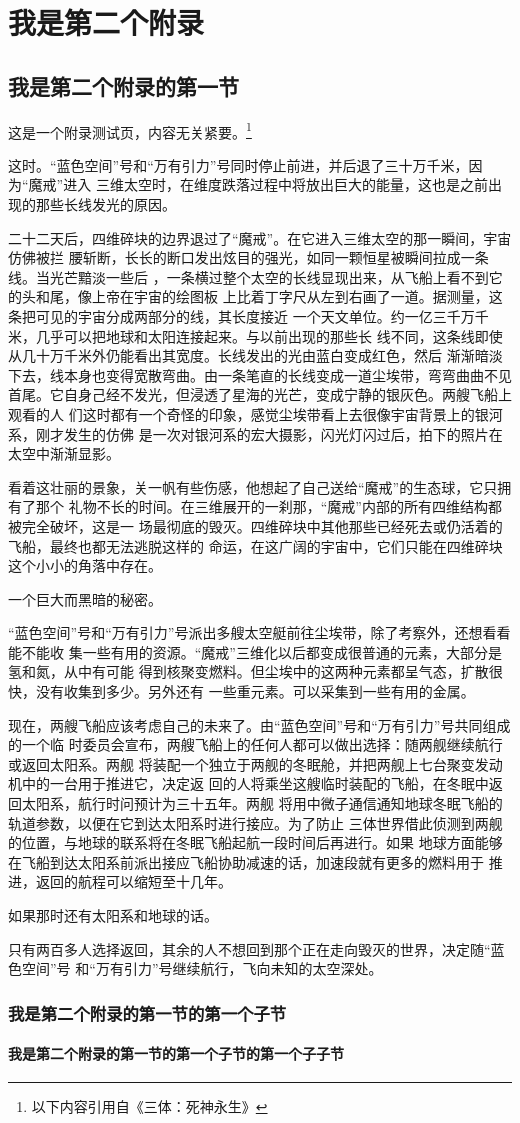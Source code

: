 \chapter{我是第二个附录}
\section{我是第二个附录的第一节}
这是一个附录测试页，内容无关紧要。\footnote{以下内容引用自《三体：死神永生》}

这时。“蓝色空间”号和“万有引力”号同时停止前进，并后退了三十万千米，因为“魔戒”进入%
三维太空时，在维度跌落过程中将放出巨大的能量，这也是之前出现的那些长线发光的原因。%

二十二天后，四维碎块的边界退过了“魔戒”。在它进入三维太空的那一瞬间，宇宙仿佛被拦%
腰斩断，长长的断口发出炫目的强光，如同一颗恒星被瞬间拉成一条线。当光芒黯淡一些后%
，一条横过整个太空的长线显现出来，从飞船上看不到它的头和尾，像上帝在宇宙的绘图板%
上比着丁字尺从左到右画了一道。据测量，这条把可见的宇宙分成两部分的线，其长度接近%
一个天文单位。约一亿三千万千米，几乎可以把地球和太阳连接起来。与以前出现的那些长%
线不同，这条线即使从几十万千米外仍能看出其宽度。长线发出的光由蓝白变成红色，然后%
渐渐暗淡下去，线本身也变得宽散弯曲。由一条笔直的长线变成一道尘埃带，弯弯曲曲不见%
首尾。它自身己经不发光，但浸透了星海的光芒，变成宁静的银灰色。两艘飞船上观看的人%
们这时都有一个奇怪的印象，感觉尘埃带看上去很像宇宙背景上的银河系，刚才发生的仿佛%
是一次对银河系的宏大摄影，闪光灯闪过后，拍下的照片在太空中渐渐显影。

看着这壮丽的景象，关一帆有些伤感，他想起了自己送给“魔戒”的生态球，它只拥有了那个%
礼物不长的时间。在三维展开的一刹那，“魔戒”内部的所有四维结构都被完全破坏，这是一%
场最彻底的毁灭。四维碎块中其他那些已经死去或仍活着的飞船，最终也都无法逃脱这样的%
命运，在这广阔的宇宙中，它们只能在四维碎块这个小小的角落中存在。

一个巨大而黑暗的秘密。

“蓝色空间”号和“万有引力”号派出多艘太空艇前往尘埃带，除了考察外，还想看看能不能收%
集一些有用的资源。“魔戒”三维化以后都变成很普通的元素，大部分是氢和氮，从中有可能%
得到核聚变燃料。但尘埃中的这两种元素都呈气态，扩散很快，没有收集到多少。另外还有%
一些重元素。可以采集到一些有用的金属。

现在，两艘飞船应该考虑自己的未来了。由“蓝色空间”号和“万有引力”号共同组成的一个临%
时委员会宣布，两艘飞船上的任何人都可以做出选择：随两舰继续航行或返回太阳系。两舰%
将装配一个独立于两舰的冬眠舱，并把两舰上七台聚变发动机中的一台用于推进它，决定返%
回的人将乘坐这艘临时装配的飞船，在冬眠中返回太阳系，航行时问预计为三十五年。两舰%
将用中微子通信通知地球冬眠飞船的轨道参数，以便在它到达太阳系时进行接应。为了防止%
三体世界借此侦测到两舰的位置，与地球的联系将在冬眠飞船起航一段时间后再进行。如果%
地球方面能够在飞船到达太阳系前派出接应飞船协助减速的话，加速段就有更多的燃料用于%
推进，返回的航程可以缩短至十几年。

如果那时还有太阳系和地球的话。

只有两百多人选择返回，其余的人不想回到那个正在走向毁灭的世界，决定随“蓝色空间”号%
和“万有引力”号继续航行，飞向未知的太空深处。

\subsection{我是第二个附录的第一节的第一个子节}
\subsubsection{我是第二个附录的第一节的第一个子节的第一个子子节}
